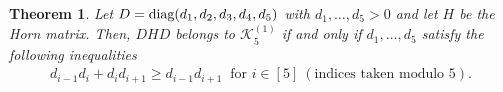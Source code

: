 \documentclass[11pt]{article}
\newtheorem{theorem}{Theorem}[section]
\numberwithin{equation}{section}
\newcommand{\MK}{{\mathcal K}}
\begin{document}
\begin{theorem}
Let $D=\text{\rm diag}(d_1,d_2,d_3,d_4,d_5)$ with $d_1,\ldots,d_5> 0$ and let $H$ be the Horn matrix. Then, $DHD$ belongs to $ \MK_5^{(1)}$ if and only if $d_1,\ldots,d_5$ satisfy the following inequalities
\begin{align}\label{eqd}
d_{i-1}d_i+d_id_{i+1}\ge d_{i-1}d_{i+1}\ \text{ for } i\in [5]\ (\text{indices taken modulo 5}).
\end{align}
\end{theorem}
\end{document}
